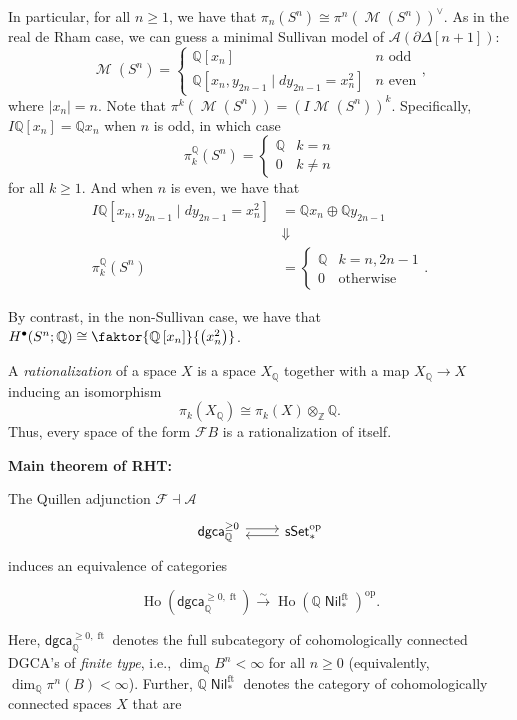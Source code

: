 \documentclass[10pt,letterpaper,cm]{nupset}
\theoremstyle{definition}
\theoremstyle{theorem}
\theoremstyle{remark}
\newcommand{\A}{\mathcal A}
\newcommand{\F}{\mathcal F}
\newcommand{\Q}{\mathbb Q}
\newcommand{\Z}{\mathbb Z}
\newcommand{\1}{\mathbb{1}}
\newcommand{\dgca}{\mathsf{dgca}}
\newcommand{\0}{\vec 0}
\DeclareMathOperator{\ft}{ft}
\DeclareMathOperator{\ho}{Ho}
\DeclareMathOperator{\M}{\mathcal{M}}
\DeclareMathOperator{\nil}{\mathsf{Nil}}
\DeclareMathOperator{\op}{op}
\begin{document}
In particular, for all $n \geq 1$, we have that $\pi_n(S^n) \cong \pi^n(\M(S^n))^{\vee}$. As in the real de Rham case, we can guess a minimal Sullivan model of $\A(\partial{\Delta\left[n+1\right]})$:
\[
\M(S^n) = \begin{cases}
\Q\left[x_n\right] & n \text{ odd}
\\ \Q\left[x_n, y_{2n-1} \mid d{y_{2n-1}} = x_n^2\right] & n \text{ even}
\end{cases},
\] where $\left\lvert{x_n}\right\rvert = n$. Note that $\pi^k(\M(S^n)) = \left(I{\M(S^n)}\right)^k$. Specifically, $I{\Q\left[x_n\right]} = \Q{x_n}$ when $n$ is odd, in which case
\[
\pi_k^{\Q}(S^n) = \begin{cases}
\Q & k = n
\\ 0 & k \ne n
\end{cases}
\] for all $k \geq 1$. And when $n$ is even, we have that 
\begin{align*}
I{ \Q\left[x_n, y_{2n-1} \mid d{y_{2n-1}} = x_n^2\right] } & = \Q{x_n} \oplus \Q{y_{2n-1}}
\\ & \Downarrow
\\ \pi_k^{\Q}(S^n) & = \begin{cases}
\Q & k = n, 2n-1
\\ 0 &  \text{otherwise}
\end{cases}.
\end{align*}

By contrast, in the non-Sullivan case, we have that $H^{\bullet}(S^n; \Q) \cong \faktor{\Q\left[x_n\right]}{\left(x_n^2\right)}$.

\medskip

A \textit{rationalization} of a space $X$ is a space $X_{\Q}$ together with a map $X_{\Q} \to X$ inducing an isomorphism
\[
\pi_k(X_{\Q}) \cong \pi_k(X) \otimes_{\Z} \Q.
\] Thus, every space of the form $\F{B}$ is a rationalization of itself. 

\textbf{Main theorem of RHT:}

\medskip

The Quillen adjunction  $\F \dashv  \A$
\[
\begin{tikzcd}
	{\dgca_{\Q}^{\geq 0}} & {\mathsf{sSet}_{\ast}^{\op}}
	\arrow[shift left=1, from=1-1, to=1-2]
	\arrow[shift left=1, from=1-2, to=1-1]
\end{tikzcd} 
\]
induces an equivalence of categories

\[  
\ho(\dgca_{\Q}^{\geq 0, \ft}) \xrightarrow{\sim} \ho(\Q{\nil}_{\ast}^{\ft})^{\op}
.\]

Here, $\dgca_{\Q}^{\geq 0, \ft}$ denotes the full subcategory of cohomologically connected DGCA's of \textit{finite type}, i.e., \linebreak $\dim_{\Q}B^n < \infty$ for all $n \geq 0$ (equivalently, $\dim_{\Q}\pi^n(B) < \infty$). Further, $\Q{\nil}_{\ast}^{\ft}$ denotes the category of cohomologically connected spaces $X$ that are
\end{document}
